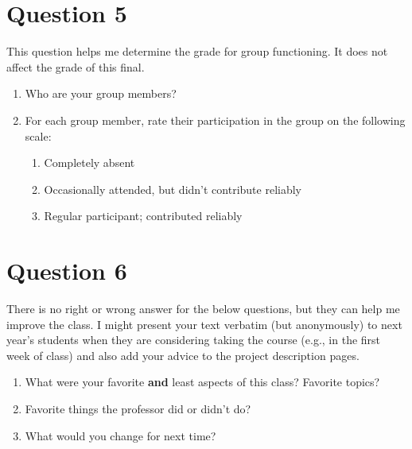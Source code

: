 \documentclass[10pt]{article}
\begin{document}
\newpage
\section{Question 5}

This question helps me determine the grade for group functioning.  It does not affect the grade of this final.

\begin{enumerate}
\item Who are your group members?
\item For each group member, rate their participation in the group on the following scale:
  \begin{enumerate}
  \item Completely absent
  \item Occasionally attended, but didn't contribute reliably
  \item Regular participant; contributed reliably
  \end{enumerate}
\end{enumerate}



\newpage
\section{Question 6}


There is no right or wrong answer for the below questions, but they can help me improve the class. 
I might present your text verbatim (but anonymously) to next year's students when they are considering taking the course (e.g., in the first week of class) and also add your advice to the project description pages.

\begin{enumerate}
\item What were your favorite \textbf{and} least aspects of this class? Favorite topics?
\item Favorite things the professor did or didn't do?
\item What would you change for next time?
\end{enumerate}
\end{document}
